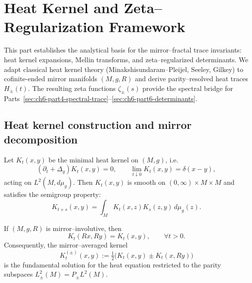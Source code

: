
\section{Heat Kernel and Zeta–Regularization Framework}
\label{sec:ch6-part2-heat-zeta} \relax \hspace{0pt}

This part establishes the analytical basis for the mirror–fractal trace invariants: heat kernel expansions, Mellin transforms, and zeta–regularized determinants.  
We adapt classical heat kernel theory (Minakshisundaram–Pleijel, Seeley, Gilkey) to cofinite-ended mirror manifolds $(M,g,R)$ and derive parity–resolved heat traces $H_\pm(t)$.  
The resulting zeta functions $\zeta_\pm(s)$ provide the spectral bridge for Parts~\ref{sec:ch6-part4-spectral-trace}–\ref{sec:ch6-part6-determinants}. %
\FlowBreaker

\subsection{Heat kernel construction and mirror decomposition}
\label{subsec:ch6-part2-heatkernel} \relax

\begin{definition}
\label{def:heatkernel}
Let $K_t(x,y)$ be the minimal heat kernel on $(M,g)$, i.e.
\[
(\partial_t + \Delta_g)K_t(x,y)=0,\qquad
\lim_{t\downarrow0}K_t(x,y)=\delta(x-y),
\]
acting on $L^2(M,d\mu_g)$.  
Then $K_t(x,y)$ is smooth on $(0,\infty)\times M\times M$ and satisfies the semigroup property:
\[
K_{t+s}(x,y)=\int_M K_t(x,z)K_s(z,y)\,d\mu_g(z).
\] %
\end{definition}

\begin{proposition}
\label{prop:heat-mirror}
If $(M,g,R)$ is mirror–involutive, then
\[
K_t(Rx,Ry)=K_t(x,y),\qquad \forall t>0.
\]
Consequently, the mirror–averaged kernel
\[
K_t^{(\pm)}(x,y):=\tfrac{1}{2}\big(K_t(x,y)\pm K_t(x,Ry)\big)
\]
is the fundamental solution for the heat equation restricted to the parity subspaces $L^2_\pm(M)=P_\pm L^2(M)$. %
\end{proposition}

